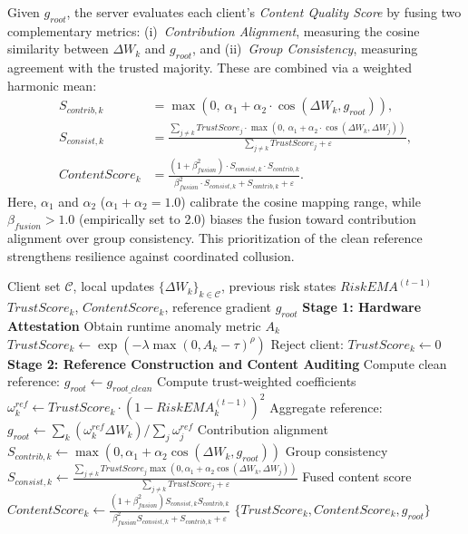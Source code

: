 \documentclass[runningheads]{llncs}
\begin{document}
Given $g_{root}$, the server evaluates each client's \emph{Content Quality Score} by fusing two complementary metrics: (i)~\emph{Contribution Alignment}, measuring the cosine similarity between $\Delta W_k$ and $g_{root}$, and (ii)~\emph{Group Consistency}, measuring agreement with the trusted majority. These are combined via a weighted harmonic mean:
\begin{align}
    S_{contrib,k} &= \max\left(0,\ \alpha_{1} + \alpha_{2} \cdot \cos(\Delta W_{k}, g_{root})\right), \\
    S_{consist,k} &= \frac{\sum_{j\neq k} TrustScore_{j} \cdot \max\left(0,\ \alpha_{1} + \alpha_{2} \cdot \cos(\Delta W_{k}, \Delta W_{j})\right)}{\sum_{j\neq k} TrustScore_{j} + \varepsilon}, \\
    ContentScore_{k} &= \frac{(1 + \beta_{fusion}^{2}) \cdot S_{consist,k} \cdot S_{contrib,k}}{\beta_{fusion}^{2}\cdot S_{consist,k} + S_{contrib,k} + \varepsilon}.
\end{align}
Here, $\alpha_{1}$ and $\alpha_{2}$ ($\alpha_1 + \alpha_2 = 1.0$) calibrate the cosine mapping range, while $\beta_{fusion} > 1.0$ (empirically set to 2.0) biases the fusion toward contribution alignment over group consistency. This prioritization of the clean reference strengthens resilience against coordinated collusion.

\begin{algorithm}[htbp]
\caption{Admissions and Content Auditing Grounded on Hardware Anchors and Pristine References}
\label{alg:phase12}
\begin{algorithmic}[1]
\REQUIRE Client set $\mathcal{C}$, local updates $\{\Delta W_k\}_{k\in\mathcal{C}}$, previous risk states $RiskEMA^{(t-1)}$
\ENSURE $TrustScore_k$, $ContentScore_k$, reference gradient $g_{root}$
\STATE \textbf{Stage 1: Hardware Attestation}
        \STATE Obtain runtime anomaly metric $A_k$
        \STATE $TrustScore_k \leftarrow \exp(-\lambda \max(0, A_k-\tau)^\rho)$
    \ELSE
        \STATE Reject client: $TrustScore_k \leftarrow 0$
    \ENDIF
\ENDFOR
\STATE \textbf{Stage 2: Reference Construction and Content Auditing}
    \STATE Compute clean reference: $g_{root} \leftarrow g_{root\_clean}$
\ELSE
    \STATE Compute trust-weighted coefficients $\omega_k^{ref} \leftarrow TrustScore_k \cdot (1 - RiskEMA_k^{(t-1)})^2$
    \STATE Aggregate reference: $g_{root} \leftarrow \sum_k (\omega_k^{ref} \Delta W_k) / \sum_j \omega_j^{ref}$
\ENDIF
{}
    \STATE Contribution alignment $S_{contrib,k} \leftarrow \max(0, \alpha_1 + \alpha_2 \cos(\Delta W_k, g_{root}))$
    \STATE Group consistency $S_{consist,k} \leftarrow \frac{\sum_{j \neq k} TrustScore_j \max(0, \alpha_1 + \alpha_2 \cos(\Delta W_k, \Delta W_j))}{\sum_{j \neq k} TrustScore_j + \varepsilon}$
    \STATE Fused content score $ContentScore_k \leftarrow \frac{(1+\beta_{fusion}^2)S_{consist,k} S_{contrib,k}}{\beta_{fusion}^2 S_{consist,k} + S_{contrib,k} + \varepsilon}$
\ENDFOR
\RETURN $\{TrustScore_k, ContentScore_k, g_{root}\}$
\end{algorithmic}
\end{algorithm}
\end{document}

